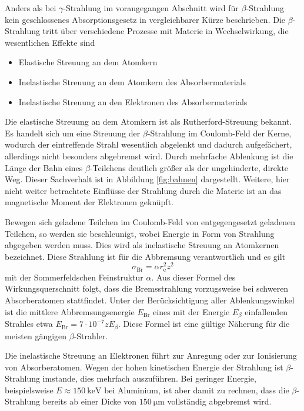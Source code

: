 Anders als bei $\gamma$-Strahlung im vorangegangen Abschnitt wird für  $\beta$-Strahlung kein geschlossenes Absorptionsgesetz in vergleichbarer Kürze beschrieben.
Die $\beta$-Strahlung tritt über verschiedene Prozesse mit Materie in Wechselwirkung, die wesentlichen Effekte sind
\begin{itemize}
	\item{Elastische Streuung an dem Atomkern}
	\item{Inelastische Streuung an dem Atomkern des Absorbermaterials}
	\item{Inelastische Streuung an den Elektronen des Absorbermaterials}
\end{itemize}

Die elastische Streuung an dem Atomkern ist als Rutherford-Streuung bekannt.
Es handelt sich um eine Streuung der $\beta$-Strahlung im Coulomb-Feld der Kerne, wodurch der eintreffende Strahl wesentlich abgelenkt und dadurch aufgefächert, allerdings nicht besonders abgebremst wird.
Durch mehrfache Ablenkung ist die Länge der Bahn eines $\beta$-Teilchens deutlich größer als der ungehinderte, direkte Weg.
Dieser Sachverhalt ist in Abbildung \ref{fig:bahnen} dargestellt.
Weitere, hier nicht weiter betrachtete Einflüsse der Strahlung durch die Materie ist an das magnetische Moment der Elektronen geknüpft.

Bewegen sich geladene Teilchen im Coulomb-Feld von entgegengesetzt geladenen Teilchen, so werden sie beschleunigt, 
wobei Energie in Form von Strahlung abgegeben werden muss.
Dies wird als inelastische Streuung an Atomkernen bezeichnet.
Diese Strahlung ist für die Abbremsung verantwortlich und es gilt
\begin{equation}
 	\sigma_\text{Br}=\alpha r_\text{e}^2 z^2
 \end{equation} 
mit der Sommerfeldschen Feinstruktur $\alpha$.
Aus dieser Formel des Wirkungsquerschnitt folgt, dass die Bremsstrahlung vorzugsweise bei schweren Absorberatomen stattfindet.
Unter der Berücksichtigung aller Ablenkungswinkel ist die mittlere Abbremsungsenergie $E_\text{Br}$ eines mit der Energie $E_\beta$ einfallenden Strahles etwa $E_\text{Br} = 7\cdot10^{-7}zE_\beta$.
Diese Formel ist eine gültige Näherung für die meisten gängigen $\beta$-Strahler.

Die inelastische Streuung an Elektronen führt zur Anregung oder zur Ionisierung von Absorberatomen.
Wegen der hohen kinetischen Energie der Strahlung ist $\beta$-Strahlung imstande, dies mehrfach auszuführen.
Bei geringer Energie, beispielsweise $E\approx\SI{150}{\kilo\electronvolt}$ bei Aluminium, ist aber damit zu rechnen, 
dass die $\beta$-Strahlung bereits ab einer Dicke von $\SI{150}{\micro\meter}$ vollständig abgebremst wird.

